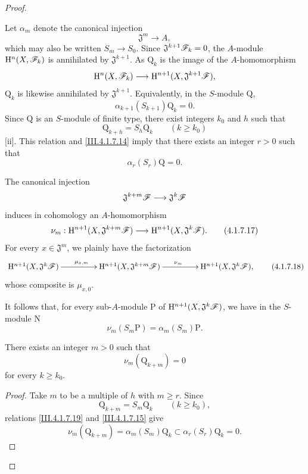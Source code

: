 \begin{proof}
\begin{env}[4.1.7.13]
\label{III.4.1.7.13}
Let $\alpha_m$ denote the canonical injection
\[
  \mathfrak{J}^m\longrightarrow A,
\]
which may also be written $S_m\to S_0$.
Since $\mathfrak{J}^{k+1}\mathscr{F}_k=0$, the $A$-module
$\mathrm{H}^n(X,\mathscr{F}_k)$ is annihilated by $\mathfrak{J}^{k+1}$.
As $\mathrm{Q}_k$ is the image of the $A$-homomorphism
\[
  \mathrm{H}^n(X,\mathscr{F}_k)
  \longrightarrow
  \mathrm{H}^{n+1}(X,\mathfrak{J}^{k+1}\mathscr{F}),
\]
$\mathrm{Q}_k$ is likewise annihilated by $\mathfrak{J}^{k+1}$.
Equivalently, in the $S$-module $\mathrm{Q}$,
\[
  \alpha_{k+1}(S_{k+1})\mathrm{Q}_k=0.
  \tag{4.1.7.14}
  \label{III.4.1.7.14}
\]
Since $\mathrm{Q}$ is an $S$-module of finite type, there exist
integers $k_0$ and $h$ such that
\[
  \mathrm{Q}_{k+h}=S_h\mathrm{Q}_k
  \qquad(k\geq k_0)
\]
[ii].
This relation and \eqref{III.4.1.7.14} imply that there exists an
integer $r>0$ such that
\[
  \alpha_r(S_r)\mathrm{Q}=0.
  \tag{4.1.7.15}
  \label{III.4.1.7.15}
\]
\end{env}

\begin{env}[4.1.7.16]
\label{III.4.1.7.16}
The canonical injection
\[
  \mathfrak{J}^{k+m}\mathscr{F}
  \longrightarrow
  \mathfrak{J}^k\mathscr{F}
\]
induces in cohomology an $A$-homomorphism
\[
  \nu_m:
  \mathrm{H}^{n+1}(X,\mathfrak{J}^{k+m}\mathscr{F})
  \longrightarrow
  \mathrm{H}^{n+1}(X,\mathfrak{J}^k\mathscr{F}).
  \tag{4.1.7.17}
  \label{III.4.1.7.17}
\]
For every $x\in\mathfrak{J}^m$, we plainly have the factorization
\[
  \xymatrix@C=4.5em{
    \HH^{n+1}(X,\mathfrak{J}^k\sh{F})
      \ar[r]^{\mu_{x,m}}
    &
    \HH^{n+1}(X,\mathfrak{J}^{k+m}\sh{F})
      \ar[r]^{\nu_m}
    &
    \HH^{n+1}(X,\mathfrak{J}^k\sh{F}),
  }
  \tag{4.1.7.18}
  \label{III.4.1.7.18}
\]
whose composite is $\mu_{x,0}$.
\end{env}


It follows that, for every sub-$A$-module $\mathrm{P}$ of
$\mathrm{H}^{n+1}(X,\mathfrak{J}^k\mathscr{F})$, we have in the $S$-module
$\mathrm{N}$
\[
  \nu_m(S_m\mathrm{P})
  =
  \alpha_m(S_m)\mathrm{P}.
  \tag{4.1.7.19}
  \label{III.4.1.7.19}
\]

\begin{lemma}[4.1.7.20]
\label{III.4.1.7.20}
There exists an integer $m>0$ such that
\[
  \nu_m(\mathrm{Q}_{k+m})=0
\]
for every $k\geq k_0$.
\end{lemma}

\begin{proof}
Take $m$ to be a multiple of $h$ with $m\geq r$.
Since
\[
  \mathrm{Q}_{k+m}=S_m\mathrm{Q}_k
  \qquad(k\geq k_0),
\]
relations \eqref{III.4.1.7.19} and \eqref{III.4.1.7.15} give
\[
  \nu_m(\mathrm{Q}_{k+m})
  =
  \alpha_m(S_m)\mathrm{Q}_k
  \subset
  \alpha_r(S_r)\mathrm{Q}_k
  =
  0.
\]
\end{proof}


\end{proof}
